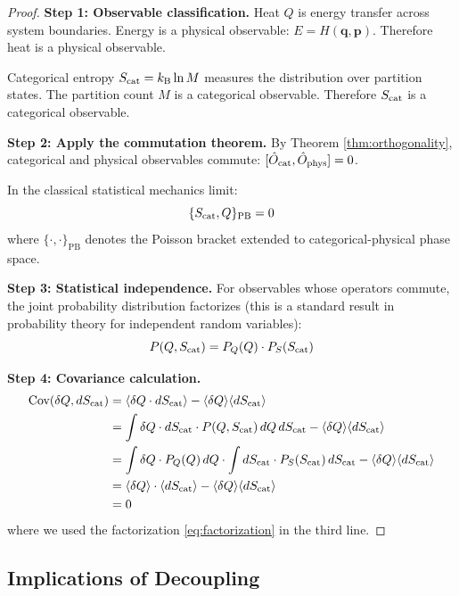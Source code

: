 \begin{proof}
\textbf{Step 1: Observable classification.}
Heat $Q$ is energy transfer across system boundaries. Energy is a physical observable: $E = H(\mathbf{q}, \mathbf{p})$. Therefore heat is a physical observable.

Categorical entropy $S_{\mathrm{cat}} = k_{\mathrm{B}} \ln M$ measures the distribution over partition states. The partition count $M$ is a categorical observable. Therefore $S_{\mathrm{cat}}$ is a categorical observable.

\textbf{Step 2: Apply the commutation theorem.}
By Theorem \ref{thm:orthogonality}, categorical and physical observables commute: $[\hat{O}_{\mathrm{cat}}, \hat{O}_{\mathrm{phys}}] = 0$.

In the classical statistical mechanics limit:
\begin{equation}
\{S_{\mathrm{cat}}, Q\}_{\text{PB}} = 0
\end{equation}
where $\{\cdot, \cdot\}_{\text{PB}}$ denotes the Poisson bracket extended to categorical-physical phase space.

\textbf{Step 3: Statistical independence.}
For observables whose operators commute, the joint probability distribution factorizes (this is a standard result in probability theory for independent random variables):
\begin{equation}
P(Q, S_{\mathrm{cat}}) = P_Q(Q) \cdot P_S(S_{\mathrm{cat}})
\label{eq:factorization}
\end{equation}

\textbf{Step 4: Covariance calculation.}
\begin{align}
\text{Cov}(\delta Q, dS_{\mathrm{cat}}) &= \langle \delta Q \cdot dS_{\mathrm{cat}} \rangle - \langle \delta Q \rangle \langle dS_{\mathrm{cat}} \rangle \\
&= \int \delta Q \cdot dS_{\mathrm{cat}} \cdot P(Q, S_{\mathrm{cat}}) \, dQ \, dS_{\mathrm{cat}} - \langle \delta Q \rangle \langle dS_{\mathrm{cat}} \rangle \\
&= \int \delta Q \cdot P_Q(Q) \, dQ \cdot \int dS_{\mathrm{cat}} \cdot P_S(S_{\mathrm{cat}}) \, dS_{\mathrm{cat}} - \langle \delta Q \rangle \langle dS_{\mathrm{cat}} \rangle \\
&= \langle \delta Q \rangle \cdot \langle dS_{\mathrm{cat}} \rangle - \langle \delta Q \rangle \langle dS_{\mathrm{cat}} \rangle \\
&= 0
\end{align}
where we used the factorization \eqref{eq:factorization} in the third line.
\end{proof}

\subsection{Implications of Decoupling}


